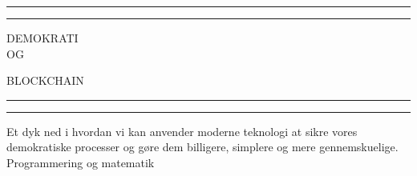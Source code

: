 \documentclass[a4paper, 8pt, oneside]{article} %
\begin{document}
 

\begin{titlepage} %

	\centering %
	
	\scshape %
	
	\vspace*{\baselineskip} %
	
	
	\rule{\textwidth}{1.6pt}\vspace*{-\baselineskip}\vspace*{2pt} %
	\rule{\textwidth}{0.4pt} %
	
	\vspace{0.75\baselineskip} %
	
	{\LARGE DEMOKRATI\\ OG\\ } %

	\vspace{0.75\baselineskip} %

	{\LARGE BLOCKCHAIN}

	\vspace{0.75\baselineskip} %
	
	\rule{\textwidth}{0.4pt}\vspace*{-\baselineskip}\vspace{3.2pt} %
	\rule{\textwidth}{1.6pt} %
	
	\vspace{2\baselineskip} %
	
	
	Et dyk ned i hvordan vi kan anvender moderne teknologi at sikre vores demokratiske processer og gøre dem billigere, simplere og mere gennemskuelige.\\ 
	Programmering og matematik%
	
	\vspace*{3\baselineskip} %
	

\end{titlepage}
\end{document}
